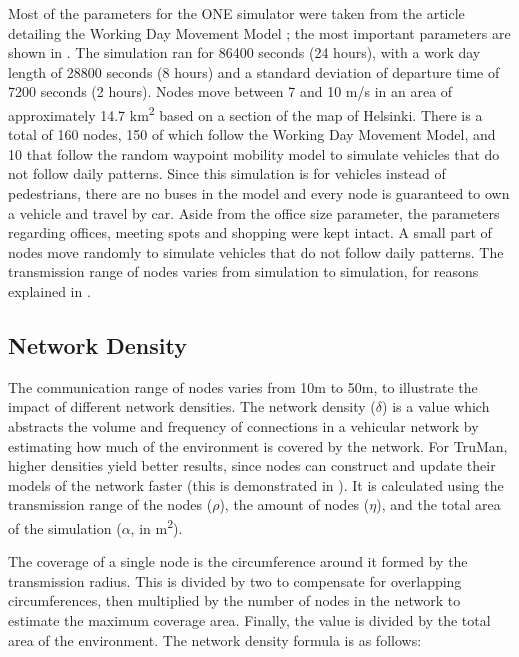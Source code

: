 Most of the parameters for the ONE simulator were taken from the article detailing the Working Day Movement Model \citep{ekman2008working}; the most important parameters are shown in .
The simulation ran for 86400 seconds (24 hours), with a work day length of 28800 seconds (8 hours) and a standard deviation of departure time of 7200 seconds (2 hours).
Nodes move between 7 and 10 m/s in an area of approximately 14.7 km\textsuperscript{2} based on a section of the map of Helsinki.
There is a total of 160 nodes, 150 of which follow the Working Day Movement Model, and 10 that follow the random waypoint mobility model to simulate vehicles that do not follow daily patterns.
Since this simulation is for vehicles instead of pedestrians, there are no buses in the model and every node is guaranteed to own a vehicle and travel by car.
Aside from the office size parameter, the parameters regarding offices, meeting spots and shopping were kept intact.
A small part of nodes move randomly to simulate vehicles that do not follow daily patterns.
The transmission range of nodes varies from simulation to simulation, for reasons explained in .

\subsection{Network Density}
\label{section:density}


The communication range of nodes varies from 10m to 50m, to illustrate the impact of different network densities.
The network density ($\delta$) is a value which abstracts the volume and frequency of connections in a vehicular network by estimating how much of the environment is covered by the network.
For TruMan, higher densities yield better results, since nodes can construct and update their models of the network faster (this is demonstrated in ).
It is calculated using the transmission range of the nodes ($\rho$), the amount of nodes ($\eta$), and the total area of the simulation ($\alpha$, in m\textsuperscript{2}).

The coverage of a single node is the circumference around it formed by the transmission radius. This is divided by two to compensate for overlapping circumferences, then multiplied by the number of nodes in the network to estimate the maximum coverage area.
Finally, the value is divided by the total area of the environment.
The network density formula is as follows:

